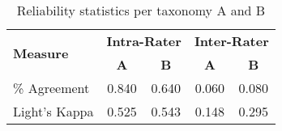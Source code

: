 \begin{table}[tb]
  \centering
  \caption{Reliability statistics per taxonomy A and B}
  \label{tab:reliability}
  \begin{tabular}{l||cc|cc}
    \toprule
    \multirow{2}{*}{\textbf{Measure}}
    & \multicolumn{2}{l}{\textbf{Intra-Rater}} & \multicolumn{2}{l}{\textbf{Inter-Rater}} \\
    & \textbf{A} & \textbf{B} & \textbf{A} & \textbf{B} \\
    \midrule
    \% Agreement \citep{McHugh:2012up} &  0.840 & 0.640 & 0.060 & 0.080 \\
    Light's Kappa \citep{Light:1971vz} &  0.525 & 0.543 & 0.148 & 0.295 \\
    \bottomrule
  \end{tabular}
  \vspace{-3mm}
\end{table}